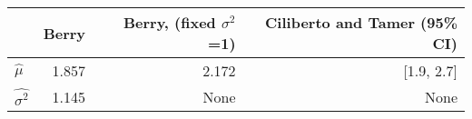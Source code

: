 \begin{tabular}{l|rrr} & Berry & Berry, (fixed $\sigma^2$ =1) & Ciliberto and Tamer (95\% CI)\\\hline
$\hat{\mu}$ & 1.857 & 2.172 & [1.9, 2.7] \\
$\hat{\sigma^2}$ & 1.145 & None & None \\
\end{tabular}